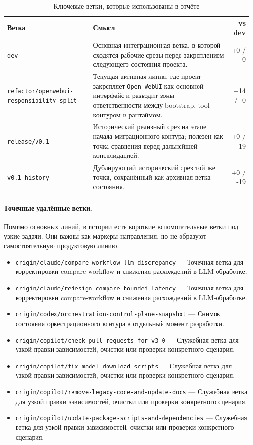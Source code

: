 \begin{table}[h]
\centering
\begin{tabular}{p{} p{} r}
\textbf{Ветка} & \textbf{Смысл} & \textbf{vs dev} \\
\hline
\texttt{dev} & Основная интеграционная ветка, в которой сходятся рабочие срезы перед закреплением следующего состояния проекта. & +0 / -0 \\
\texttt{refactor/openwebui-responsibility-split} & Текущая активная линия, где проект закрепляет \texttt{Open WebUI} как основной интерфейс и разводит зоны ответственности между bootstrap, tool-контуром и рантаймом. & +14 / -0 \\
\texttt{release/v0.1} & Исторический релизный срез на этапе начала миграционного контура; полезен как точка сравнения перед дальнейшей консолидацией. & +0 / -19 \\
\texttt{v0.1\_history} & Дублирующий исторический срез той же точки, сохранённый как архивная ветка состояния. & +0 / -19 \\
\end{tabular}
\caption{Ключевые ветки, которые использованы в отчёте}
\end{table}

\paragraph{Точечные удалённые ветки.} Помимо основных линий, в истории есть короткие вспомогательные ветки под узкие задачи. Они важны как маркеры направления, но не образуют самостоятельную продуктовую линию.
\begin{itemize}
\item \texttt{origin/claude/compare-workflow-llm-discrepancy} --- Точечная ветка для корректировки compare-workflow и снижения расхождений в LLM-обработке.
\item \texttt{origin/claude/redesign-compare-bounded-latency} --- Точечная ветка для корректировки compare-workflow и снижения расхождений в LLM-обработке.
\item \texttt{origin/codex/orchestration-control-plane-snapshot} --- Снимок состояния оркестрационного контура в отдельный момент разработки.
\item \texttt{origin/copilot/check-pull-requests-for-v3-0} --- Служебная ветка для узкой правки зависимостей, очистки или проверки конкретного сценария.
\item \texttt{origin/copilot/fix-model-download-scripts} --- Служебная ветка для узкой правки зависимостей, очистки или проверки конкретного сценария.
\item \texttt{origin/copilot/remove-legacy-code-and-update-docs} --- Служебная ветка для узкой правки зависимостей, очистки или проверки конкретного сценария.
\item \texttt{origin/copilot/update-package-scripts-and-dependencies} --- Служебная ветка для узкой правки зависимостей, очистки или проверки конкретного сценария.
\end{itemize}
